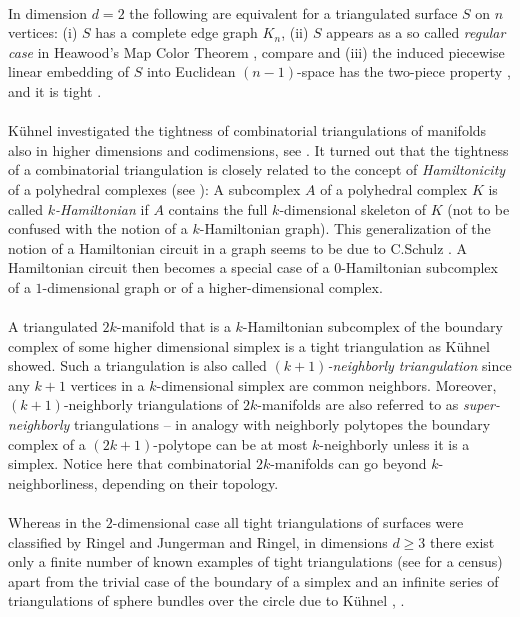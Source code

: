 \documentclass[a4paper,11pt]{report}
\begin{document}
{{\\
 In dimension $d=2$ the following are equivalent for a triangulated surface $S$ on $n$ vertices: (i) $S$ has a complete edge graph $K_n$, (ii) $S$ appears as a so called \emph{regular case} in Heawood's Map Color Theorem \cite{Ringel74MapColThm}, compare \cite{Kuehnel95TightPolySubm} and (iii) the induced piecewise linear embedding of $S$ into Euclidean $(n-1)$-space has the two-piece property \cite{Banchoff74TightPolyKBProjPMB}, and it is tight \cite{Kuehnel95TightPolySubm}.\\
\\
 K{\"u}hnel investigated the tightness of combinatorial triangulations of
manifolds also in higher dimensions and codimensions, see \cite{Kuehnel94ManSkelConvPolyt}. It turned out that the tightness of a combinatorial triangulation is closely
related to the concept of \emph{Hamiltonicity} of a polyhedral complexes (see \cite{Kuehnel95TightPolySubm}): A subcomplex $A$ of a polyhedral complex $K$ is called \emph{$k$-Hamiltonian} if $A$ contains the full $k$-dimensional skeleton of $K$ (not to be confused with the notion of a $k$-Hamiltonian graph). This generalization of the notion of a Hamiltonian
circuit in a graph seems to be due to C.Schulz \cite{Schulz94PolyhMnfPoly}. A Hamiltonian circuit then becomes a special case of a $0$-Hamiltonian subcomplex of a $1$-dimensional graph or of a higher-dimensional complex.\\
\\
 A triangulated $2k$-manifold that is a $k$-Hamiltonian subcomplex of the boundary complex of some higher dimensional
simplex is a tight triangulation as K{\"u}hnel \cite{Kuehnel95TightPolySubm} showed. Such a triangulation is also called \emph{$(k+1)$-neighborly triangulation} since any $k+1$ vertices in a $k$-dimensional simplex are common neighbors. Moreover, $(k+1)$-neighborly triangulations of $2k$-manifolds are also referred to as \emph{super-neighborly} triangulations -- in analogy with neighborly polytopes the boundary complex of
a $(2k+1)$-polytope can be at most $k$-neighborly unless it is a simplex. Notice here that combinatorial $2k$-manifolds can go beyond $k$-neighborliness, depending on their topology.\\
\\
 Whereas in the $2$-dimensional case all tight triangulations of surfaces were classified by
Ringel and Jungerman and Ringel, in dimensions $d\geq 3$ there exist only a finite number of known examples of tight triangulations
(see \cite{Kuehnel99CensusTight} for a census) apart from the trivial case of the boundary of a simplex and an
infinite series of triangulations of sphere bundles over the circle due to
K{\"u}hnel \cite{Kuehnel95TightPolySubm}, \cite{Kuehnel86HigherDimCsaszar}. }

}
\end{document}
